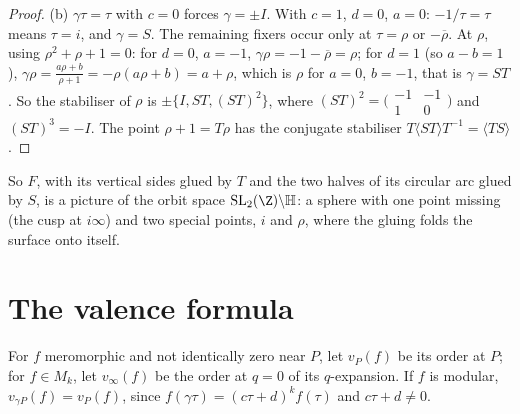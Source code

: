 \begin{proof}
(b) $\gamma\tau=\tau$ with $c=0$ forces $\gamma=\pm I$. With $c=1$, $d=0$, $a=0$: $-1/\tau=\tau$ means $\tau=i$, and $\gamma=S$. The remaining fixers occur only at
$\tau=\rho$ or $-\overline\rho$. At $\rho$, using $\rho^2+\rho+1=0$: for $d=0$, $a=-1$, $\gamma\rho=-1-\overline\rho=\rho$; for $d=1$ (so $a-b=1$),
$\gamma\rho=\frac{a\rho+b}{\rho+1}=-\rho(a\rho+b)=a+\rho$, which is $\rho$ for $a=0$, $b=-1$, that is $\gamma=ST$. So the stabiliser of $\rho$ is
$\pm\{I,ST,(ST)^2\}$, where $(ST)^2=\bigl(\begin{smallmatrix}-1&-1\\1&0\end{smallmatrix}\bigr)$ and $(ST)^3=-I$. The point $\rho+1=T\rho$ has the conjugate
stabiliser $T\langle ST\rangle T^{-1}=\langle TS\rangle$.
\end{proof}

So $F$, with its vertical sides glued by $T$ and the two halves of its circular arc glued by $S$, is a picture of the orbit space $\mathrm{SL}_2(\Z)\backslash\mathbb H$:
a sphere with one point missing (the cusp at $i\infty$) and two special points, $i$ and $\rho$, where the gluing folds the surface onto itself.

\section{The valence formula}

For $f$ meromorphic and not identically zero near $P$, let $v_P(f)$ be its order at $P$; for $f\in M_k$, let $v_\infty(f)$ be the order at $q=0$ of its $q$-expansion.
If $f$ is modular, $v_{\gamma P}(f)=v_P(f)$, since $f(\gamma\tau)=(c\tau+d)^kf(\tau)$ and $c\tau+d\ne0$.

